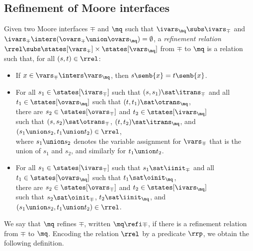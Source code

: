 \subsection{Refinement of Moore interfaces} 


Given two Moore interfaces $\mp$ and $\mq$ such that 
$\ivars_\mq \subs \ivars_\mp$ and 
$\ivars_\mp \inters (\ovars_\mp \union \ovars_\mq) = \emptyset$, 
a {\em refinement relation\/} 
$\rrel \subs \states[\vars_\mp] \times \states[\vars_\mq]$ 
from $\mp$ to $\mq$ is a relation such that, for all $(s,t) \in \rrel$:
%
\begin{itemize} 

\item If $x \in \vars_\mp \inters \vars_\mq$, 
then $s \semb{x} = t \semb{x}$.

\item For all $s_1 \in \states[\ivars_\mp]$ 
such that $(s,s_1) \sat \itrans_\mp$ 
and all $t_1 \in \states[\ovars_\mq]$ 
such that $(t,t_1) \sat \otrans_\mq$, \\
there are $s_2 \in \states[\ovars_\mp]$ 
and $t_2 \in \states[\ivars_\mq]$ \\
such that $(s,s_2) \sat \otrans_\mp$, 
$(t,t_2) \sat \itrans_\mq$, and 
$(s_1 \union s_2, t_1 \union t_2) \in \rrel$, \\
where $s_1 \union s_2$ denotes the variable assignment for $\vars_\mp$
that is the union of $s_1$ and $s_2$, and similarly for $t_1 \union t_2$. 

\item For all $s_1 \in \states[\ivars_\mp]$ 
such that $s_1 \sat \iinit_\mp$ 
and all $t_1 \in \states[\ovars_\mq]$ 
such that $t_1 \sat \oinit_\mq$, \\
there are $s_2 \in \states[\ovars_\mp]$ 
and $t_2 \in \states[\ivars_\mq]$ \\
such that $s_2 \sat \oinit_\mp$, 
$t_2 \sat \iinit_\mq$, and 
$(s_1 \union s_2, t_1 \union t_2) \in \rrel$.

\end{itemize}
%
We say that $\mq$ refines $\mp$, written $\mq \refi \mp$, if there is
a refinement relation from $\mp$ to $\mq$. 
Encoding the relation $\rrel$ by a predicate $\rrp$, we obtain the
following definition. 

